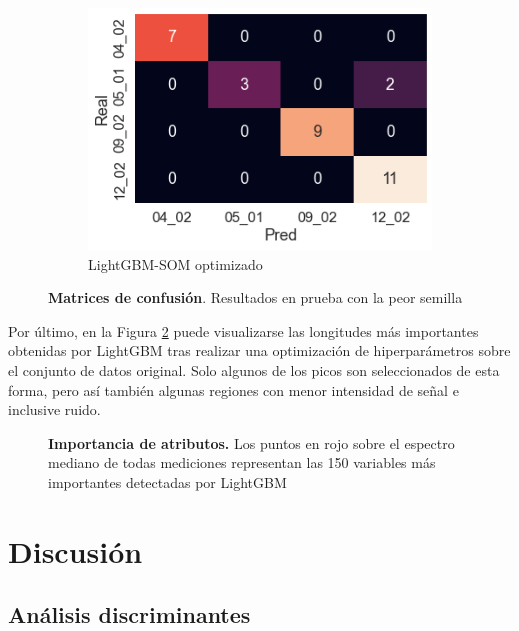 \documentclass[12pt]{article}
\begin{document}
\begin{figure}[htbp]
\begin{subfigure}[b]{0.35\textwidth}
    \end{subfigure}
    \begin{subfigure}[b]{0.35\textwidth}
        \caption{LightGBM-SOM optimizado}
        \includegraphics[width=\textwidth]{LightGBMSOMopt.png}
    \end{subfigure}
    \caption{\textbf{Matrices de confusión}. Resultados en prueba con la peor semilla }  
    \label{fig:classifier}
\end{figure}

Por último, en la Figura \ref{fig:feature_importance} puede visualizarse las longitudes más importantes obtenidas por LightGBM tras realizar una optimización de hiperparámetros sobre el conjunto de datos original. Solo algunos de los picos son seleccionados de esta forma, pero así también algunas regiones con menor intensidad de señal e inclusive ruido.

\begin{figure}[htbp]
    \centering
    
    \caption{\textbf{Importancia de atributos.} Los puntos en rojo sobre el espectro mediano de todas mediciones representan las 150 variables más importantes detectadas por LightGBM}
    \label{fig:feature_importance}
\end{figure}

\section{Discusión}

\subsection{Análisis discriminantes}
\end{document}
